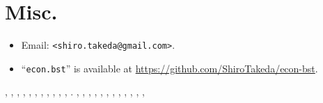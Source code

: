 \documentclass[10pt]{article}
\begin{document}
\section{Misc.}

\begin{itemize}
 \item Email: \verb|<shiro.takeda@gmail.com>|.
 \item ``\texttt{econ.bst}'' is available at \url{https://github.com/ShiroTakeda/econ-bst}.
\end{itemize}
\vspace*{1em}

\citet{borgers95:_note_implem_stron_domin},
\citet{bergemann11:_ration},
\citet{takeda2015a},
\citet{Takeda2014a},
\citet{Biker-2007-unemployment},
\citet{Babiker-1999-JapaneseNuclearPower},
\citet{Babiker-1999-KyotoProtocoland},
\citet{Babiker2000525},
\citet{BabikerRutherford-2005-EconomicEffectsof},
\citet{goldin:katz:2011}, \citet{goldin:katz:2008}, \citet{goldin:katz:2000}.
\citet{stakeda2019web},
\citet{Rivers-2005-CombiningTop-Downand},
\citet{WilsonMannOtsuki-2005-AssessingBenefitsof},
\citet{zhang2016Deep},
\citet{imbens2019Optimized},
\citet{essd-10-405-2018},
\citet{luthi08:_high},
\citet{doi:10.1175/2009BAMS2778.1},
\citet{d'Aspremont-2004-BalancedBayesianMechanisms},
\citet{d'Aspremont-2003-CorrelationIndependenceAndBayesian},
\citet{Chung-1999-ANoteOnMatsushima's},
\citet{d'Aspremont-1998-LinearInequalityMethodsTo},

\vspace*{1em}

\nocite{*}




\end{document}
